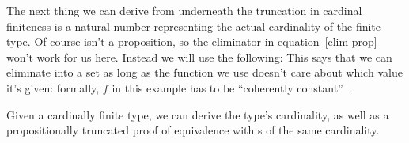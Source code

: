 The next thing we can derive from underneath the truncation in cardinal
finiteness is a natural number representing the actual cardinality of the finite
type.
Of course {\Nat} isn't a proposition, so the eliminator in
equation~\ref{elim-prop} won't work for us here.
Instead we will use the following:
This says that we can eliminate into a set as long as the function we use
doesn't care about which value it's given: formally, \(f\) in this example has
to be ``coherently constant''~\citep{krausGeneralUniversalProperty2015}.

\begin{lemma}\label{card-finite-cardinality}
  Given a cardinally finite type, we can derive the type's cardinality, as well
  as a propositionally truncated proof of equivalence with s of
  the same cardinality.
\end{lemma}
